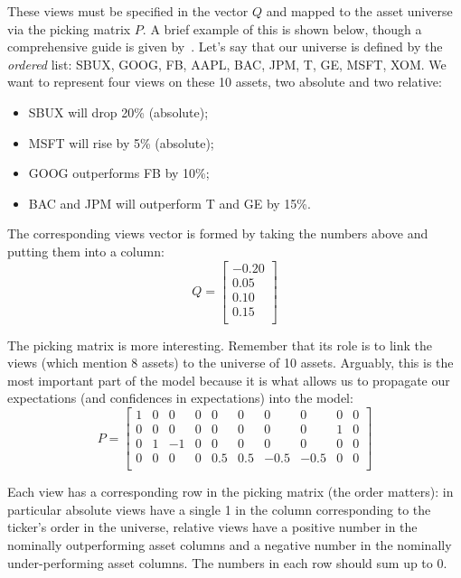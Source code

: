 These views must be specified in the vector $Q$ and mapped to the asset universe via the picking matrix $P$. A brief example of this is shown below, though a comprehensive guide is given by~\cite{bib:Idzorek}.
Let’s say that our universe is defined by the \emph{ordered} list: SBUX, GOOG, FB, AAPL, BAC, JPM, T, GE, MSFT, XOM. We want to represent four views on these 10 assets, two absolute and two relative:
\begin{itemize}
\item SBUX will drop 20\% (absolute);
\item MSFT will rise by 5\% (absolute);
\item GOOG outperforms FB by 10\%;
\item BAC and JPM will outperform T and GE by 15\%.
\end{itemize}

The corresponding views vector is formed by taking the numbers above and putting them into a column:
\begin{equation}
Q = \begin{bmatrix}-0.20 \\ 0.05\\ 0.10\\ 0.15\\\end{bmatrix}
\end{equation}

The picking matrix is more interesting. Remember that its role is to link the views (which mention 8 assets) to the universe of 10 assets. Arguably, this is the most important part of the model because it is what allows us to propagate our expectations (and confidences in expectations) into the model:
\begin{equation}
P = \begin{bmatrix}
1 & 0 & 0 & 0 & 0 & 0 & 0 & 0 & 0 & 0 \\
0 & 0 & 0 & 0 & 0 & 0 & 0 & 0 & 1 & 0 \\
0 & 1 & -1 & 0 & 0 & 0 & 0 & 0 & 0 & 0 \\
0 & 0 & 0 & 0 & 0.5 & 0.5 & -0.5 & -0.5 & 0 & 0 \\
\end{bmatrix}
\end{equation}

Each view has a corresponding row in the picking matrix (the order matters): in particular absolute views have a single 1 in the column corresponding to the ticker’s order in the universe, relative views have a positive number in the nominally outperforming asset columns and a negative number in the nominally under-performing asset columns. The numbers in each row should sum up to 0.


